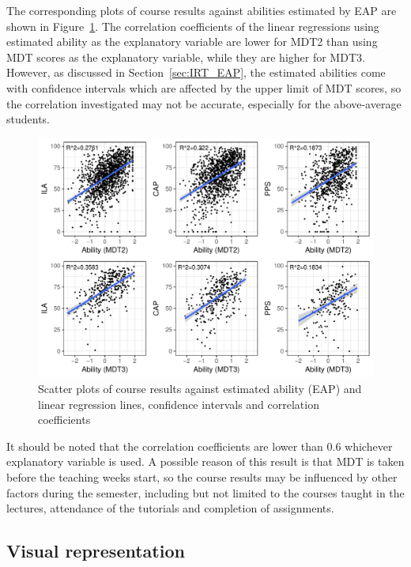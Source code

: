\documentclass[a4paper]{report}
\begin{document}
The corresponding plots of course results against abilities estimated by EAP are shown in Figure~\ref{fig:REL_scatter_Ability}. The correlation coefficients of the linear regressions using estimated ability as the explanatory variable are lower for MDT2 than using MDT scores as the explanatory variable, while they are higher for MDT3. However, as discussed in Section~\ref{sec:IRT_EAP}, the estimated abilities come with confidence intervals which are affected by the upper limit of MDT scores, so the correlation investigated may not be accurate, especially for the above-average students. 

\begin{figure}[H]
  \centering
  \includegraphics[width=\linewidth]{fig/REL_scatter_Ability.pdf}
  \caption{\label{fig:REL_scatter_Ability}Scatter plots of course results against estimated ability (EAP) and linear regression lines, confidence intervals and correlation coefficients}
\end{figure}

It should be noted that the correlation coefficients are lower than 0.6 whichever explanatory variable is used. A possible reason of this result is that MDT is taken before the teaching weeks start, so the course results may be influenced by other factors during the semester, including but not limited to the courses taught in the lectures, attendance of the tutorials and completion of assignments. 

\subsection{Visual representation}
\end{document}
